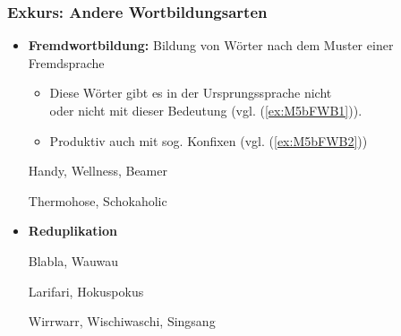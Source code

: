 \begin{frame}
\frametitle{Exkurs: Andere Wortbildungsarten}

\begin{itemize}
\item \textbf{Fremdwortbildung:} Bildung von Wörter nach dem Muster einer Fremdsprache 

	\begin{itemize}
		\item Diese Wörter gibt es in der Ursprungssprache nicht \\
		oder nicht mit dieser Bedeutung (vgl. (\ref{ex:M5bFWB1})).
		
		\item Produktiv auch mit sog. Konfixen (vgl. (\ref{ex:M5bFWB2}))
	\end{itemize}

\ea\label{ex:M5bFWB1} Handy, Wellness, Beamer

\ex\label{ex:M5bFWB2} Thermohose, Schokaholic
\z


\item \textbf{Reduplikation}

	
	\settowidth{} 
	\ea Blabla, Wauwau 
	\z
	
	
	\ea Larifari, Hokuspokus \jambox{[Reimdopplung]}
	\z
	
	
	\ea Wirrwarr, Wischiwaschi, Singsang  \jambox{[Ablautdopplung]}
	\z
	
\end{itemize}

\end{frame}


